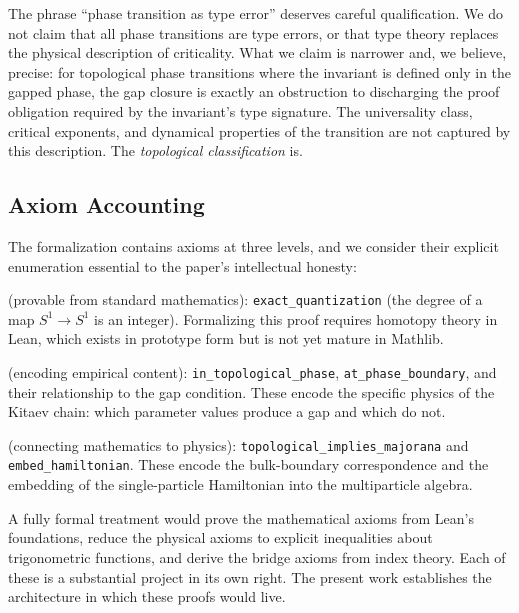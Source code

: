 \documentclass[11pt,a4paper]{article}
\newcommand{\lean}[1]{\lstinline[language=Lean4]{#1}}
\begin{document}
The phrase ``phase transition as type error'' deserves careful qualification. We do not claim that all phase transitions are type errors, or that type theory replaces the physical description of criticality. What we claim is narrower and, we believe, precise: for topological phase transitions where the invariant is defined only in the gapped phase, the gap closure is exactly an obstruction to discharging the proof obligation required by the invariant's type signature. The universality class, critical exponents, and dynamical properties of the transition are not captured by this description. The \emph{topological classification} is.

\subsection{Axiom Accounting}

The formalization contains axioms at three levels, and we consider their explicit enumeration essential to the paper's intellectual honesty:

\begin{description}[leftmargin=2em]
    \item[Mathematical axioms] (provable from standard mathematics): \lean{exact_quantization} (the degree of a map $S^1 \to S^1$ is an integer). Formalizing this proof requires homotopy theory in Lean, which exists in prototype form but is not yet mature in Mathlib.
    
    \item[Physical axioms] (encoding empirical content): \lean{in_topological_phase}, \lean{at_phase_boundary}, and their relationship to the gap condition. These encode the specific physics of the Kitaev chain: which parameter values produce a gap and which do not.
    
    \item[Bridge axioms] (connecting mathematics to physics): \lean{topological_implies_majorana} and \lean{embed_hamiltonian}. These encode the bulk-boundary correspondence and the embedding of the single-particle Hamiltonian into the multiparticle algebra.
\end{description}

A fully formal treatment would prove the mathematical axioms from Lean's foundations, reduce the physical axioms to explicit inequalities about trigonometric functions, and derive the bridge axioms from index theory. Each of these is a substantial project in its own right. The present work establishes the architecture in which these proofs would live.
\end{document}
